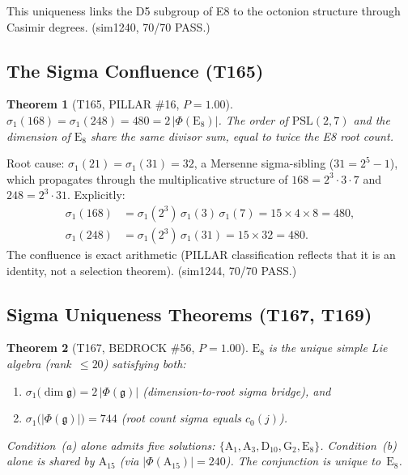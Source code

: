\documentclass[aps,prd,twocolumn,superscriptaddress,floatfix,nofootinbib]{revtex4-2}
\newtheorem{theorem}{Theorem}
\theoremstyle{definition}
\theoremstyle{remark}
\begin{document}
\noindent
This uniqueness links the D5 subgroup of E8 to the octonion
structure through Casimir degrees.  (sim1240, 70/70 PASS.)

\subsection{The Sigma Confluence (T165)}
\label{sec:sigma-confluence}

\begin{theorem}[T165, PILLAR \#16, $P{=}1.00$]
$\sigma_1(168) = \sigma_1(248) = 480 = 2\,|\Phi(\mathrm{E}_8)|$.
The order of $\mathrm{PSL}(2,7)$ and the dimension of $\mathrm{E}_8$
share the same divisor sum, equal to twice the E8 root count.
\end{theorem}

\noindent
Root cause: $\sigma_1(21) = \sigma_1(31) = 32$, a Mersenne
sigma-sibling ($31 = 2^5 - 1$), which propagates through the
multiplicative structure of $168 = 2^3 \cdot 3 \cdot 7$ and
$248 = 2^3 \cdot 31$.  Explicitly:
\begin{align}
  \sigma_1(168) &= \sigma_1(2^3)\,\sigma_1(3)\,\sigma_1(7)
    = 15 \times 4 \times 8 = 480, \label{eq:sigma-168}\\
  \sigma_1(248) &= \sigma_1(2^3)\,\sigma_1(31)
    = 15 \times 32 = 480. \label{eq:sigma-248}
\end{align}
The confluence is exact arithmetic (PILLAR classification reflects
that it is an identity, not a selection theorem).  (sim1244, 70/70 PASS.)

\subsection{Sigma Uniqueness Theorems (T167, T169)}
\label{sec:sigma-uniqueness}

\begin{theorem}[T167, BEDROCK \#56, $P{=}1.00$]
$\mathrm{E}_8$ is the unique simple Lie algebra (rank~$\le 20$)
satisfying both:
\begin{enumerate}
  \item[(a)] $\sigma_1\!\bigl(\dim\mathfrak{g}\bigr) =
        2\,|\Phi(\mathfrak{g})|$
        \quad(dimension-to-root sigma bridge), and
  \item[(b)] $\sigma_1\!\bigl(|\Phi(\mathfrak{g})|\bigr) = 744$
        \quad(root count sigma equals $c_0(j)$).
\end{enumerate}
Condition~(a) alone admits five solutions:
$\{\mathrm{A}_1, \mathrm{A}_3, \mathrm{D}_{10}, \mathrm{G}_2,
\mathrm{E}_8\}$.  Condition~(b) alone is shared by $\mathrm{A}_{15}$
(via $|\Phi(\mathrm{A}_{15})| = 240$).  The conjunction is unique
to~$\mathrm{E}_8$.
\end{theorem}
\end{document}
